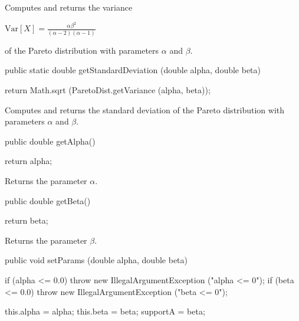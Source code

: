 \begin{tabb}  Computes and returns the variance
\begin{latexonly}
   $\mbox{Var}[X] = \frac{\alpha\beta^2}{(\alpha - 2)(\alpha - 1)}$
\end{latexonly}
   of the Pareto distribution with parameters $\alpha$ and $\beta$.
\end{tabb}
\begin{htmlonly}
\end{htmlonly}
\begin{code}

   public static double getStandardDeviation (double alpha, double beta)\begin{hide} {
      return Math.sqrt (ParetoDist.getVariance (alpha, beta));
   }\end{hide}
\end{code}
\begin{tabb}  Computes and returns the standard deviation of the Pareto
   distribution with parameters $\alpha$ and $\beta$.
\end{tabb}
\begin{htmlonly}
\end{htmlonly}
\begin{code}

   public double getAlpha()\begin{hide} {
      return alpha;
   }\end{hide}
\end{code}
  \begin{tabb} Returns the parameter $\alpha$.
  \end{tabb}
\begin{code}

   public double getBeta()\begin{hide} {
      return beta;
   }\end{hide}
\end{code}
  \begin{tabb} Returns the parameter $\beta$.
  \end{tabb}
\begin{code}

   public void setParams (double alpha, double beta)\begin{hide} {
      if (alpha <= 0.0)
        throw new IllegalArgumentException ("alpha <= 0");
      if (beta <= 0.0)
        throw new IllegalArgumentException ("beta <= 0");

      this.alpha = alpha;
      this.beta = beta;
      supportA = beta;
   }\end{hide}
\end{code}
